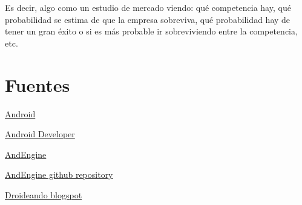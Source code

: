 \documentclass[12 pt, a4paper, twoside]{article}
\begin{document}
Es decir, algo como un estudio de mercado viendo:
qué competencia hay,
 qué probabilidad se estima de que la empresa sobreviva,
qué probabilidad hay de tener un gran éxito o si es más probable ir sobreviviendo entre la competencia, etc.


\section{Fuentes}
\href{http://www.android.com}{Android}

\href{http://developer.android.com/index.html}{Android Developer}

\href{http://www.andengine.org/}{AndEngine}

\href{https://github.com/nicolasgramlich/AndEngine}{AndEngine github repository}

\href{http://droideando.blogspot.com.es}{Droideando blogspot}
\end{document}
